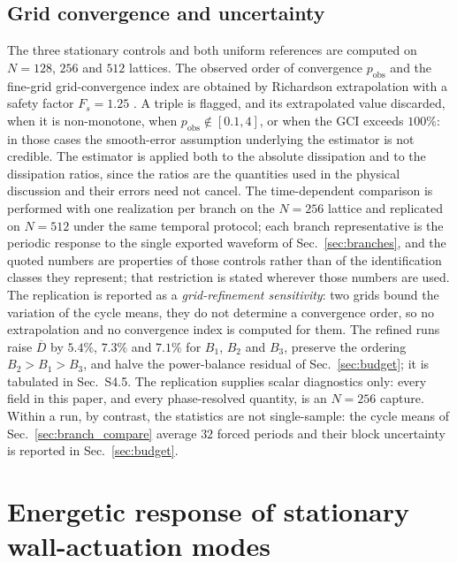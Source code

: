 \documentclass[11pt,a4paper]{article}
\newcommand{\Dbar}{\overline{D}}
\begin{document}
\subsection{Grid convergence and uncertainty}
\label{sec:gci}

The three stationary controls and both uniform references are computed on
$N=128$, $256$ and $512$ lattices. The observed order of convergence
$p_{\mathrm{obs}}$ and the fine-grid grid-convergence index are obtained by
Richardson extrapolation with a safety factor $F_s=1.25$
\cite{roache1994perspective,celik2008procedure}. A triple is flagged, and its
extrapolated value discarded, when it is non-monotone, when
$p_{\mathrm{obs}}\notin[0.1,4]$, or when the GCI exceeds $100\%$: in those cases
the smooth-error assumption underlying the estimator is not credible. The
estimator is applied both to the absolute dissipation and to the dissipation
ratios, since the ratios are the quantities used in the physical discussion and
their errors need not cancel. The time-dependent comparison is performed with one
realization per branch on the $N=256$ lattice and replicated on $N=512$ under the
same temporal protocol; each branch representative is the
periodic response to the single exported waveform of Sec.~\ref{sec:branches}, and
the quoted numbers are properties of those controls rather than of the
identification classes they represent; that restriction is stated wherever those
numbers are used. The replication is reported as a \emph{grid-refinement
sensitivity}: two grids bound the variation of the cycle means, they do not
determine a convergence order, so no extrapolation and no convergence index is
computed for them. The refined runs raise $\Dbar$ by $5.4\%$, $7.3\%$ and $7.1\%$
for $B_1$, $B_2$ and $B_3$, preserve the ordering $B_2>B_1>B_3$, and halve the
power-balance residual of Sec.~\ref{sec:budget}; it is tabulated in Sec.~S4.5.
The replication supplies scalar diagnostics only: every field in this paper, and
every phase-resolved quantity, is an $N=256$ capture.
Within a run, by contrast, the
statistics are not single-sample:
the cycle means of Sec.~\ref{sec:branch_compare} average $32$ forced periods and
their block uncertainty is reported in Sec.~\ref{sec:budget}.

\section{Energetic response of stationary wall-actuation modes}
\label{sec:stationary}
\end{document}
